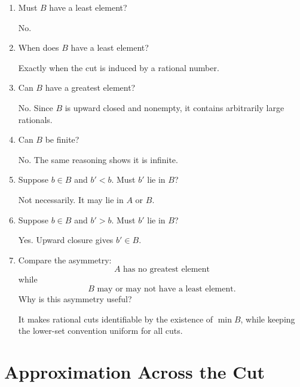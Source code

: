 \documentclass{essay}
\begin{document}
\begin{enumerate}[label=\arabic*., itemsep=10pt]
\item Must $B$ have a least element?

\begin{answer}
No.
\end{answer}

\item When does $B$ have a least element?

\begin{answer}
Exactly when the cut is induced by a rational number.
\end{answer}

\item Can $B$ have a greatest element?

\begin{answer}
No. Since $B$ is upward closed and nonempty, it contains arbitrarily large rationals.
\end{answer}

\item Can $B$ be finite?

\begin{answer}
No. The same reasoning shows it is infinite.
\end{answer}

\item Suppose $b\in B$ and $b'<b$.
Must $b'$ lie in $B$?

\begin{answer}
Not necessarily. It may lie in $A$ or $B$.
\end{answer}

\item Suppose $b\in B$ and $b'>b$.
Must $b'$ lie in $B$?

\begin{answer}
Yes. Upward closure gives $b'\in B$.
\end{answer}

\item Compare the asymmetry:
\[
A\text{ has no greatest element}
\]
while
\[
B\text{ may or may not have a least element}.
\]
Why is this asymmetry useful?

\begin{answer}
It makes rational cuts identifiable by the existence of $\min B$, while keeping the lower-set convention uniform for all cuts.
\end{answer}

\end{enumerate}

\section{Approximation Across the Cut}
\end{document}
